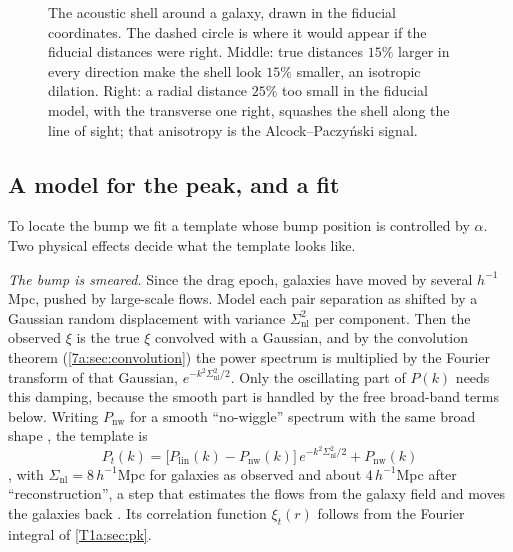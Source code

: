 \begin{figure}[htbp]
\centering
{}
\caption{The acoustic shell around a galaxy, drawn in the fiducial coordinates.
The dashed circle is where it would appear if the fiducial distances were right.
Middle: true distances $15\%$ larger in every direction make the shell look $15\%$
smaller, an isotropic dilation. Right: a radial distance $25\%$ too small in the
fiducial model, with the transverse one right, squashes the shell along the line
of sight; that anisotropy is the Alcock--Paczy\'nski signal.}
\label{11a:fig:dilation}
\end{figure}

\subsection{A model for the peak, and a fit}
\label{11a:sec:bao-fit}

To locate the bump we fit a template whose bump position is controlled by
$\alpha$. Two physical effects decide what the template looks like.

\emph{The bump is smeared.} Since the drag epoch, galaxies have moved by several
$h^{-1}$Mpc, pushed by large-scale flows. Model each pair separation as shifted by
a Gaussian random displacement with variance $\Sigma_{\mathrm{nl}}^2$ per
component. Then the observed $\xi$ is the true $\xi$ convolved with a Gaussian, and
by the convolution theorem (\cref{7a:sec:convolution}) the power spectrum is
multiplied by the Fourier transform of that Gaussian, $e^{-k^2\Sigma_{\mathrm{nl}}^2/2}$.
Only the oscillating part of $P(k)$ needs this damping, because the smooth part
is handled by the free broad-band terms below. Writing $P_{\mathrm{nw}}$ for a
smooth ``no-wiggle'' spectrum with the same broad shape \cite{EisensteinHu1998},
the template is
\begin{equation}
  P_t(k)=\bigl[P_{\mathrm{lin}}(k)-P_{\mathrm{nw}}(k)\bigr]\,
  e^{-k^2\Sigma_{\mathrm{nl}}^2/2}+P_{\mathrm{nw}}(k)
  \label{11a:eq:template}
\end{equation}
, with $\Sigma_{\mathrm{nl}}=8\,h^{-1}$Mpc for
galaxies as observed and about $4\,h^{-1}$Mpc after ``reconstruction'', a step
that estimates the flows from the galaxy field and moves the galaxies back
. Its correlation function $\xi_t(r)$ follows from the
Fourier integral of \cref{T1a:sec:pk}.

